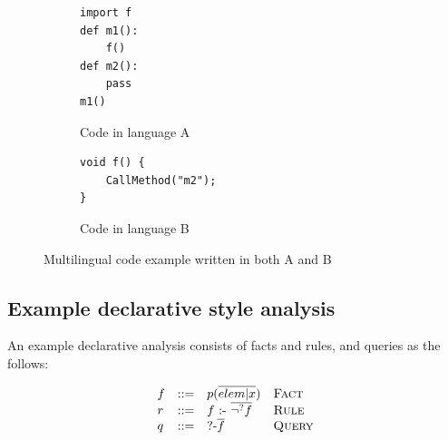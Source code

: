 \begin{figure}[t]
  \centering
  \begin{subfigure}[t]{0.23\textwidth}
    \begin{lstlisting}[style=mpython]
import f
def m1():
    f()
def m2():
    pass
m1()
    \end{lstlisting}
    \vspace*{-.5em}
    \caption{Code in language A}
    \label{fig:exam:langA}
  \end{subfigure}
  \begin{subfigure}[t]{0.23\textwidth}
    \begin{lstlisting}[style=mcpp,firstnumber=9]
void f() {
    CallMethod("m2");
}
    \end{lstlisting}
    \vspace*{2.5em}
    \caption{Code in language B}
    \label{fig:exam:langB}
  \end{subfigure}
  \vspace*{-.5em}
  \caption{Multilingual code example written in both A and B}
  \label{fig:exam}
\end{figure}

%

\subsection{Example declarative style analysis}
An example declarative analysis consists of facts and rules, and queries as the
follows:

{\small
\[
  \begin{array}{llll}
    f & ::= & p(\overline{elem | x}) & \text{\sc Fact}\\
    r & ::= & f\ \mbox{:-}\ \overline{\neg^? f} & \text{\sc Rule}\\
    q & ::= & \mbox{?-} \overline{f}\ &  \text{\sc Query}
\end{array}
\]
}


